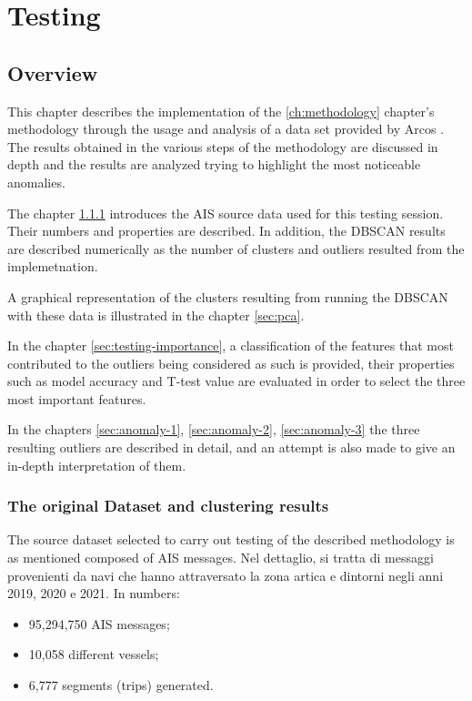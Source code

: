 \chapter{Testing}
\label{ch:testing}

\section{Overview}

This chapter describes the implementation of the \ref{ch:methodology} chapter's methodology through the usage and analysis of a data set provided by Arcos \cite{arcos}. The results obtained in the various steps of the methodology are discussed in depth and the results are analyzed trying to highlight the most noticeable anomalies.

The chapter \ref{sec:testing-dataset} introduces the AIS source data used for this testing session. Their numbers and properties are described. In addition, the DBSCAN results are described numerically as the number of clusters and outliers resulted from the implemetnation.

A graphical representation of the clusters resulting from running the DBSCAN with these data is illustrated in the chapter \ref{sec:pca}.

In the chapter \ref{sec:testing-importance}, a classification of the features that most contributed to the outliers being considered as such is provided, their properties such as model accuracy and T-test value are evaluated in order to select the three most important features.

In the chapters \ref{sec:anomaly-1}, \ref{sec:anomaly-2}, \ref{sec:anomaly-3} the three resulting outliers are described in detail, and an attempt is also made to give an in-depth interpretation of them.

\clearpage
\subsection{The original Dataset and clustering results}
\label{sec:testing-dataset}
The source dataset selected to carry out testing of the described methodology is as mentioned composed of AIS messages.
Nel dettaglio, si tratta di messaggi provenienti da navi che hanno attraversato la zona artica e dintorni negli anni 2019, 2020 e 2021.
In numbers:
\begin{itemize}
\item 95,294,750 AIS messages;
\item 10,058 different vessels;
\item 6,777 segments (trips) generated.
\end{itemize}

